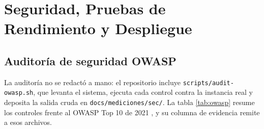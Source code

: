 \documentclass[12pt,a4paper]{article}
\begin{document}
\section{Seguridad, Pruebas de Rendimiento y Despliegue}
\label{sec:seguridad-rendimiento}

\subsection{Auditoría de seguridad OWASP}

La auditoría no se redactó a mano: el repositorio incluye \texttt{scripts/audit-owasp.sh}, que
levanta el sistema, ejecuta cada control contra la instancia real y deposita la salida cruda en
\texttt{docs/mediciones/sec/}. La tabla \ref{tab:owasp} resume los controles frente al OWASP Top
10 de 2021 \parencite{owasp2021}, y su columna de evidencia remite a esos archivos.
\end{document}
